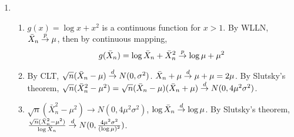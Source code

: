 \documentclass{article}
\begin{document}
\begin{enumerate}[leftmargin = 0 em, label = \arabic*., font = \bfseries]
	\item 
	\begin{enumerate}
		\item 
		$g(x) = \log x + x^2$ is a continuous function for $x > 1$. By WLLN, $\bar{X}_n \overset{p}{\to} \mu$, then by continuous mapping, 
		\[g(\bar{X}_n) = \log \bar{X}_n + \bar{X}_n^2 \overset{p}{\to} \log \mu + \mu^2\] 

		\item 
		By CLT, $\sqrt{n} (\bar{X}_n - \mu) \overset{d}{\to} N(0,\sigma^2)$. $\bar{X}_n + \mu \overset{d}{\to} \mu + \mu = 2 \mu$. By Slutsky's theorem, $\sqrt{n}(\bar{X}_n^2 - \mu^2) = \sqrt{n} (\bar{X}_n - \mu) (\bar{X}_n + \mu) \overset{d}{\to} N(0, 4 \mu^2 \sigma^2)$.

		\item 
		$\sqrt{n}(\bar{X}_n^2 - \mu^2) \to N(0, 4 \mu^2 \sigma^2)$, $\log \bar{X}_n \overset{d}{\to} \log \mu$. By Slutsky's theorem, $\frac{\sqrt{n}(\bar{X}_n^2 - \mu^2)}{\log \bar{X}_n} \overset{d}{\to} N(0, \frac{4 \mu^2 \sigma^2}{(\log \mu)^2})$.
 	\end{enumerate}
	
	
 	\end{enumerate}
	
\end{document}
